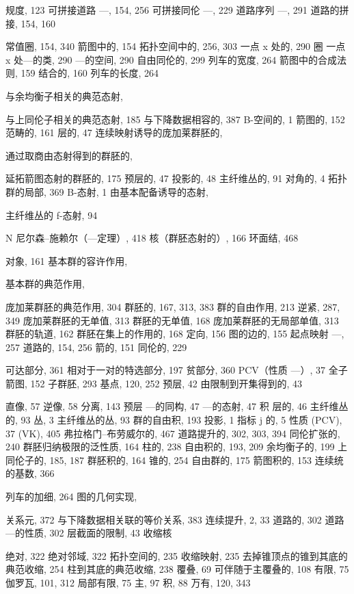 规度, 123 可拼接道路 ---, 154, 256 可拼接同伦 ---, 229 道路序列 ---, 291 道路的拼接, 154, 160


常值圈, 154, 340 箭图中的, 154 拓扑空间中的, 256, 303 一点 x 处的, 290 圈 一点 x 处---的类, 290 ---的空间, 290 自由同伦的, 299 列车的宽度, 264 箭图中的合成法则, 159 结合的, 160 列车的长度, 264


与余均衡子相关的典范态射,

与上同伦子相关的典范态射, 185 与下降数据相容的, 387 B-空间的, 1 箭图的, 152 范畴的, 161 层的, 47 连续映射诱导的庞加莱群胚的,

通过取商由态射得到的群胚的,

延拓箭图态射的群胚的, 175 预层的, 47 投影的, 48 主纤维丛的, 91 对角的, 4 拓扑群的局部, 369 B-态射, 1 由基本配备诱导的态射,

主纤维丛的 f-态射, 94

N 尼尔森–施赖尔（---定理）, 418 核（群胚态射的）, 166 环面结, 468


对象, 161 基本群的容许作用,

基本群的典范作用,

庞加莱群胚的典范作用, 304 群胚的, 167, 313, 383 群的自由作用, 213 逆紧, 287, 349 庞加莱群胚的无单值, 313 群胚的无单值, 168 庞加莱群胚的无局部单值, 313 群胚的轨道, 162 群胚在集上的作用的, 168 定向, 156 图的边的, 155 起点映射 ---, 257 道路的, 154, 256 箭的, 151 同伦的, 229


可达部分, 361 相对于一对的特选部分, 197 贫部分, 360 PCV（性质 ---）, 37 全子箭图, 152 子群胚, 293 基点, 120, 252 预层, 42 由限制到开集得到的, 43

直像, 57 逆像, 58 分离, 143 预层 ---的同构, 47 ---的态射, 47 积 层的, 46 主纤维丛的, 93 丛, 3 主纤维丛的丛, 93 群的自由积, 193 投影, 1 指标 j 的, 5 性质 (PCV), 37 (VK), 405 弗拉格门–布劳威尔的, 467 道路提升的, 302, 303, 394 同伦扩张的, 240 群胚归纳极限的泛性质, 164 柱的, 238 自由积的, 193, 209 余均衡子的, 199 上同伦子的, 185, 187 群胚积的, 164 锥的, 254 自由群的, 175 箭图积的, 153 连续统的基数, 366


列车的加细, 264 图的几何实现,

关系元, 372 与下降数据相关联的等价关系, 383 连续提升, 2, 33 道路的, 302 道路---的性质, 302 层截面的限制, 43 收缩核

绝对, 322 绝对邻域, 322 拓扑空间的, 235 收缩映射, 235 去掉锥顶点的锥到其底的典范收缩, 254 柱到其底的典范收缩, 238 覆叠, 69 可伴随于主覆叠的, 108 有限, 75 伽罗瓦, 101, 312 局部有限, 75 主, 97 积, 88 万有, 120, 343

